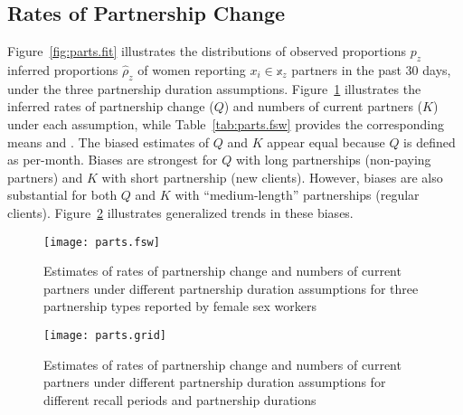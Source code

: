 \subsection{Rates of Partnership Change}\label{res.parts}
Figure~\ref{fig:parts.fit} illustrates the distributions of
observed proportions $p_z$ \vs inferred proportions $\hat{\rho}_z$ of women
reporting $x_i \in \mathbb{x}_z$ partners in the past 30 days,
under the three partnership duration assumptions.
Figure~\ref{fig:parts.fsw} illustrates the inferred
rates of partnership change ($Q$) and numbers of current partners ($K$) under each assumption,
while Table~\ref{tab:parts.fsw} provides the corresponding means and \ci.
The biased estimates of $Q$ and $K$ appear equal because $Q$ is defined as per-month.
Biases are strongest for
$Q$ with long partnerships (\eg non-paying partners) and
$K$ with short partnership (\eg new clients).
However, biases are also substantial for
both $Q$ and $K$ with ``medium-length'' partnerships (\eg regular clients).
Figure~\ref{fig:parts.grid} illustrates generalized trends in these biases.
\begin{figure}
  \centering\texttt{[image: parts.fsw]}
  \caption{Estimates of rates of partnership change and numbers of current partners
    under different partnership duration assumptions
    for three partnership types reported by female sex workers}
  \label{fig:parts.fsw}
\end{figure}
\begin{figure}
  \centering\texttt{[image: parts.grid]}
  \caption{Estimates of rates of partnership change and numbers of current partners
    under different partnership duration assumptions
    for different recall periods and partnership durations}
  \label{fig:parts.grid}
\end{figure}
